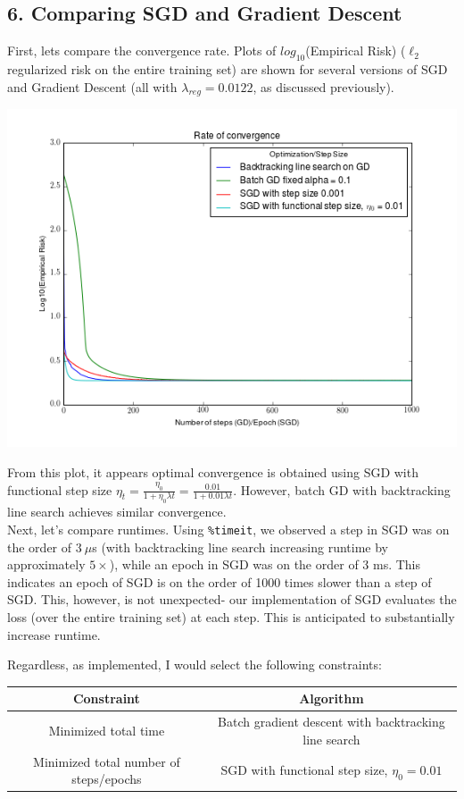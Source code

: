 \documentclass[paper=a4, fontsize=11pt]{scrartcl} %
\numberwithin{equation}{section} %
\numberwithin{figure}{section} %
\numberwithin{table}{section} %
\begin{document}
\subsection*{6. Comparing SGD and Gradient Descent}

First, lets compare the convergence rate. Plots of $log_{10}$(Empirical Risk) ($\ell_2$ regularized risk on the entire training set) are shown for several versions of SGD and Gradient Descent (all with $\lambda_{reg} = 0.0122$, as discussed previously).

\includegraphics[scale=.7]{./../figures/2_6_6.png}

From this plot, it appears optimal convergence is obtained using SGD with functional step size $\eta_t = \frac{\eta_0}{1 + \eta_0 \lambda t} = \frac{0.01}{1 + 0.01 \lambda t}$. However, batch GD with backtracking line search achieves similar convergence.
\\

Next, let's compare runtimes. Using \texttt{\%timeit}, we observed a step in SGD was on the order of $3~\mu$s (with backtracking line search increasing runtime by approximately $5\times$), while an epoch in SGD was on the order of 3 ms. This indicates an epoch of SGD is on the order of 1000 times slower than a step of SGD. This, however, is not unexpected- our implementation of SGD evaluates the loss (over the entire training set) at each step. This is anticipated to substantially increase runtime. 

Regardless, as implemented, I would select the following constraints:

\begin{center}
\begin{tabular}{|c | c |}
\hline
Constraint & Algorithm \\
\hline
Minimized total time & Batch gradient descent with backtracking line search \\
\hline
Minimized total number of steps/epochs & SGD with functional step size, $\eta_0 = 0.01$ \\
\hline
\end{tabular}
\end{center}
\end{document}
